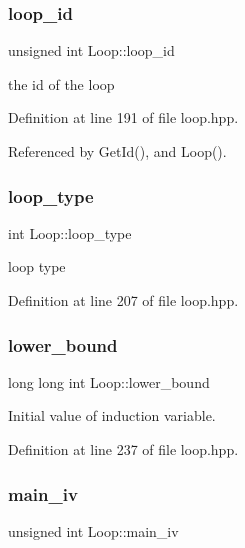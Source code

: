 \subsubsection{\texorpdfstring{loop\+\_\+id}{loop\_id}}
{\footnotesize\ttfamily unsigned int Loop\+::loop\+\_\+id\hspace{0.3cm}{\ttfamily [private]}}



the id of the loop 



Definition at line 191 of file loop.\+hpp.



Referenced by Get\+Id(), and Loop().

\mbox{\label{classLoop_a9fc5bf34e3b83e67b52e2b1b4d2f6fbb}} 
\subsubsection{\texorpdfstring{loop\+\_\+type}{loop\_type}}
{\footnotesize\ttfamily int Loop\+::loop\+\_\+type}



loop type 



Definition at line 207 of file loop.\+hpp.

\mbox{\label{classLoop_a9cc14c2a53623b781857a1cdd9565e73}} 
\subsubsection{\texorpdfstring{lower\+\_\+bound}{lower\_bound}}
{\footnotesize\ttfamily long long int Loop\+::lower\+\_\+bound}



Initial value of induction variable. 



Definition at line 237 of file loop.\+hpp.

\mbox{\label{classLoop_a4219dae712820c72a62df2a091c1141a}} 
\subsubsection{\texorpdfstring{main\+\_\+iv}{main\_iv}}
{\footnotesize\ttfamily unsigned int Loop\+::main\+\_\+iv}



